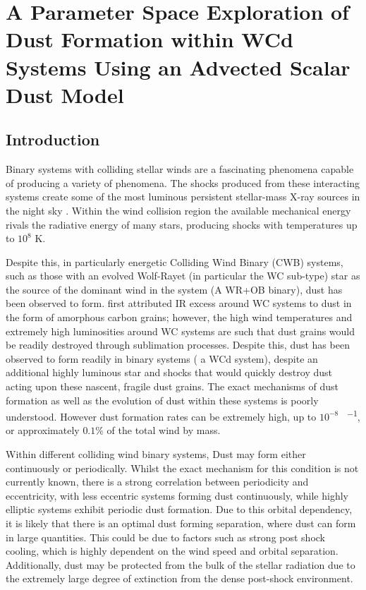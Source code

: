\chapter[A Parameter Space Exploration of Dust Formation]{A Parameter Space Exploration of Dust Formation within WCd Systems Using an Advected Scalar Dust Model}


\begin{abstract}
    
\end{abstract}

\section{Introduction}

Binary systems with colliding stellar winds are a fascinating phenomena capable of producing a variety of phenomena.
The shocks produced from these interacting systems create some of the most luminous persistent stellar-mass X-ray sources in the night sky \parencite{usov_stellar_1991}.
Within the wind collision region the available mechanical energy rivals the radiative energy of many stars, producing shocks with temperatures up to $10^8$ \si{\kelvin}.

Despite this, in particularly energetic Colliding Wind Binary (CWB) systems, such as those with an evolved Wolf-Rayet (in particular the WC sub-type) star as the source of the dominant wind in the system (A WR+OB binary), dust has been observed to form.
\textcite{allenInfraredPhotometryNorthern1972} first attributed IR excess around WC systems to dust in the form of amorphous carbon grains; however, the high wind temperatures and extremely high luminosities around WC systems are such that dust grains would be readily destroyed through sublimation processes.
Despite this, dust has been observed to form readily in binary systems ( a WCd system), despite an additional highly luminous star and shocks that would quickly destroy dust acting upon these nascent, fragile dust grains.
The exact mechanisms of dust formation as well as the evolution of dust within these systems is poorly understood.
However dust formation rates can be extremely high, up to $10^{-8}$ \si{\solarmass\per\year}, or approximately $0.1\%$ of the total wind by mass.


Within different colliding wind binary systems, Dust may form either continuously or periodically.
Whilst the exact mechanism for this condition is not currently known, there is a strong correlation between periodicity and eccentricity, with less eccentric systems forming dust continuously, while highly elliptic systems exhibit periodic dust formation.
Due to this orbital dependency, it is likely that there is an optimal dust forming separation, where dust can form in large quantities. This could be due to factors such as strong post shock cooling, which is highly dependent on the wind speed and orbital separation.
Additionally, dust may be protected from the bulk of the stellar radiation due to the extremely large degree of extinction from the dense post-shock environment.

